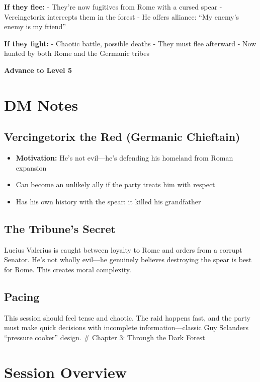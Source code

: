 \documentclass[
]{book}
\providecommand{\tightlist}{%
  \setlength{\itemsep}{0pt}\setlength{\parskip}{0pt}}
\begin{document}
\textbf{If they flee:} - They're now fugitives from Rome with a cursed
spear - Vercingetorix intercepts them in the forest - He offers
alliance: ``My enemy's enemy is my friend''

\textbf{If they fight:} - Chaotic battle, possible deaths - They must
flee afterward - Now hunted by both Rome and the Germanic tribes

\textbf{Advance to Level 5}

\section{DM Notes}\label{dm-notes-1}

\subsection{Vercingetorix the Red (Germanic
Chieftain)}\label{vercingetorix-the-red-germanic-chieftain}

\begin{itemize}
\tightlist
\item
  \textbf{Motivation:} He's not evil---he's defending his homeland from
  Roman expansion
\item
  Can become an unlikely ally if the party treats him with respect
\item
  Has his own history with the spear: it killed his grandfather
\end{itemize}

\subsection{The Tribune's Secret}\label{the-tribunes-secret}

Lucius Valerius is caught between loyalty to Rome and orders from a
corrupt Senator. He's not wholly evil---he genuinely believes destroying
the spear is best for Rome. This creates moral complexity.

\subsection{Pacing}\label{pacing}

This session should feel tense and chaotic. The raid happens fast, and
the party must make quick decisions with incomplete
information---classic Guy Sclanders ``pressure cooker'' design. \#
Chapter 3: Through the Dark Forest

\section{Session Overview}\label{session-overview-2}
\end{document}
